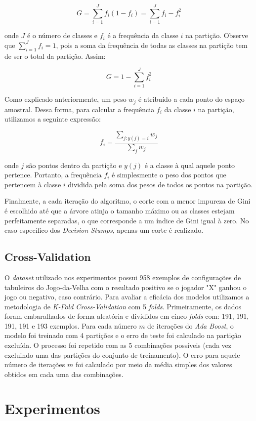 \documentclass{article}
\begin{document}
\[
G = \sum_{i = 1}^{J} f_i (1 - f_i) = \sum_{i = 1}^{J} f_i - f_i^2
\]

onde $ J $ é o número de classes e $ f_i $ é a frequência da classe $ i $ na partição. Observe que
$ \sum_{i = 1}^{J} f_i = 1 $, pois a soma da frequência de todas as classes na partição tem de
ser o total da partição. Assim:

\[
G = 1 - \sum_{i = 1}^{J} f_i^2
\]

Como explicado anteriormente, um peso $ w_j $ é atribuído a cada ponto do espaço amostral. Dessa
forma, para calcular a frequência $ f_i $ da classe $ i $ na partição, utilizamos a seguinte expressão:

\[
f_i = \frac{\sum_{j : y(j) = i} w_j}{\sum_{j} w_j}
\]

onde $ j $ são pontos dentro da partição e $ y(j) $ é a classe à qual aquele ponto pertence. Portanto,
a frequência $ f_i $ é simplesmente o peso dos pontos que pertencem à classe $ i $ dividida pela soma
dos pesos de todos os pontos na partição.

Finalmente, a cada iteração do algoritmo, o corte com a menor impureza de Gini é escolhido até que 
a árvore atinja o tamanho máximo ou as classes estejam perfeitamente separadas, o que corresponde a 
um índice de Gini igual à zero. No caso específico dos \textit{Decision Stumps}, apenas um corte 
é realizado.

\subsection{Cross-Validation}

O \textit{dataset} utilizado nos experimentos possui 958 exemplos de configurações de tabuleiros
do Jogo-da-Velha com o resultado positivo se o jogador "X" ganhou o jogo ou negativo, caso contrário. 
Para avaliar a eficácia dos modelos utilizamos a metodologia de \textit{K-Fold Cross-Validation} com 5 \textit{folds}. 
Primeiramente, os dados foram embaralhados de forma aleatória e divididos em cinco \textit{folds} com: 191, 191, 
191, 191 e 193 exemplos. Para cada número $ m $ de iterações do \textit{Ada Boost}, o modelo foi
treinado com 4 partições e o erro de teste foi calculado na partição excluída. O processo
foi repetido com as 5 combinações possíveis (cada vez excluindo uma das partições do conjunto de treinamento).
O erro para aquele número de iterações $ m $ foi calculado por meio da média simples 
dos valores obtidos em cada uma das combinações.

\section{Experimentos}
\end{document}
